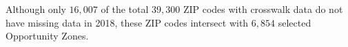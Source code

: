         Although only $16,007$ of
        the total $39,300$ ZIP codes with crosswalk data
        do not have missing data in 2018,
        these ZIP codes intersect with
        $6,854$ selected Opportunity Zones.%

